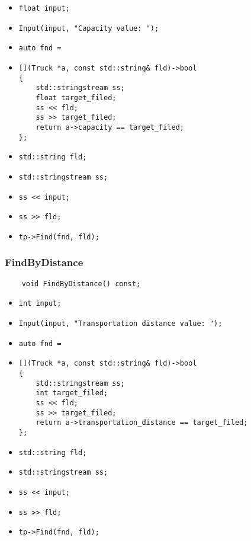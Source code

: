 \begin{itemize}
	\item \verb|float input;|
    \item \verb|Input(input, "Capacity value: ");|
    \item \verb|auto fnd =|
    \item \verb|[](Truck *a, const std::string& fld)->bool|\\
    \verb|{|\\
    \verb|    std::stringstream ss;|\\
    \verb|    float target_filed;|\\
    \verb|    ss << fld;|\\
    \verb|    ss >> target_filed;|\\
    \verb|    return a->capacity == target_filed;|\\
    \verb|};|
    \item \verb|std::string fld;|
    \item \verb|std::stringstream ss;|
    \item \verb|ss << input;|
    \item \verb|ss >> fld;|
    \item \verb|tp->Find(fnd, fld);|
\end{itemize}



\subsubsection*{FindByDistance}

\begin{lstlisting}
    void FindByDistance() const;
\end{lstlisting}

\begin{itemize}
	\item \verb|int input;|
    \item \verb|Input(input, "Transportation distance value: ");|
    \item \verb|auto fnd =|
    \item \verb|[](Truck *a, const std::string& fld)->bool|\\
    \verb|{|\\
    \verb|    std::stringstream ss;|\\
    \verb|    int target_filed;|\\
    \verb|    ss << fld;|\\
    \verb|    ss >> target_filed;|\\
    \verb|    return a->transportation_distance == target_filed;|\\
    \verb|};|
    \item \verb|std::string fld;|
    \item \verb|std::stringstream ss;|
    \item \verb|ss << input;|
    \item \verb|ss >> fld;|
    \item \verb|tp->Find(fnd, fld);|
\end{itemize}


